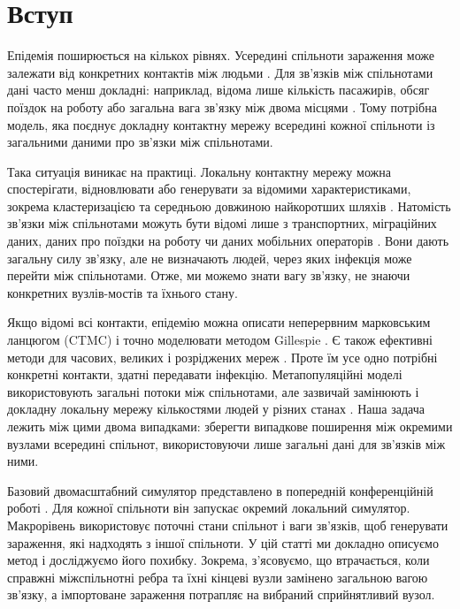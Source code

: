 \begingroup\color{black}
\hypersetup{citecolor=black,linkcolor=black}

\section{Вступ}
\label{sec:introduction}

Епідемія поширюється на кількох рівнях. Усередині спільноти зараження може залежати від конкретних контактів між людьми \citep{keeling2005,pastorsatorras2015,kiss2017}. Для зв'язків між спільнотами дані часто менш докладні: наприклад, відома лише кількість пасажирів, обсяг поїздок на роботу або загальна вага зв'язку між двома місцями \citep{balcan2009,barbosa2018human}. Тому потрібна модель, яка поєднує докладну контактну мережу всередині кожної спільноти із загальними даними про зв'язки між спільнотами.

Така ситуація виникає на практиці. Локальну контактну мережу можна спостерігати, відновлювати або генерувати за відомими характеристиками, зокрема кластеризацією та середньою довжиною найкоротших шляхів \citep{eubank2004,danon2011}. Натомість зв'язки між спільнотами можуть бути відомі лише з транспортних, міграційних даних, даних про поїздки на роботу чи даних мобільних операторів \citep{barbosa2018human,chang2021}. Вони дають загальну силу зв'язку, але не визначають людей, через яких інфекція може перейти між спільнотами. Отже, ми можемо знати вагу зв'язку, не знаючи конкретних вузлів-мостів та їхнього стану.

Якщо відомі всі контакти, епідемію можна описати неперервним марковським ланцюгом (CTMC) і точно моделювати методом Gillespie \citep{gillespie1977exact,gibson2000}. Є також ефективні методи для часових, великих і розріджених мереж \citep{vestergaard2015,kuryliak2025simulating}. Проте їм усе одно потрібні конкретні контакти, здатні передавати інфекцію. Метапопуляційні моделі використовують загальні потоки між спільнотами, але зазвичай замінюють і докладну локальну мережу кількостями людей у різних станах \citep{colizza2007reaction,colizza2008,balcan2010modeling,ajelli2010}. Наша задача лежить між цими двома випадками: зберегти випадкове поширення між окремими вузлами всередині спільнот, використовуючи лише загальні дані для зв'язків між ними.

Базовий двомасштабний симулятор представлено в попередній конференційній роботі \citep{kuryliak2025towards}. Для кожної спільноти він запускає окремий локальний симулятор. Макрорівень використовує поточні стани спільнот і ваги зв'язків, щоб генерувати зараження, які надходять з іншої спільноти. У цій статті ми докладно описуємо метод і досліджуємо його похибку. Зокрема, з'ясовуємо, що втрачається, коли справжні міжспільнотні ребра та їхні кінцеві вузли замінено загальною вагою зв'язку, а імпортоване зараження потрапляє на вибраний сприйнятливий вузол.

